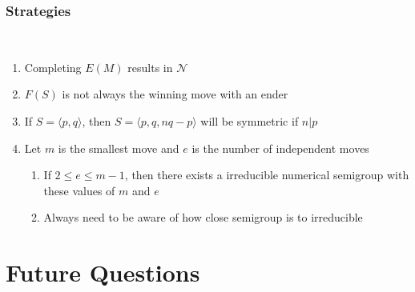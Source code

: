 \documentclass{beamer}
\begin{document}

\begin{frame}
\begin{center}
\frametitle{Strategies}

~\\

\begin{enumerate}

\item Completing $E \left( M \right)$ results in $\mathscr{N}$

\item $F \left( S \right)$ is not always the winning move with an ender

\item If $S = \langle p, q \rangle$, then $S = \langle p, q, n q - p \rangle$ will be symmetric if $n \vert p$

\item Let $m$ is the smallest move and $e$ is the number of independent moves

\begin{enumerate}

\item If $2 \leq e \leq m - 1$, then there exists a irreducible numerical semigroup with these values of $m$ and $e$

\item Always need to be aware of how close semigroup is to irreducible

\end{enumerate}

\end{enumerate}

\end{center}
\end{frame}

\section{Future Questions}
\end{document}
